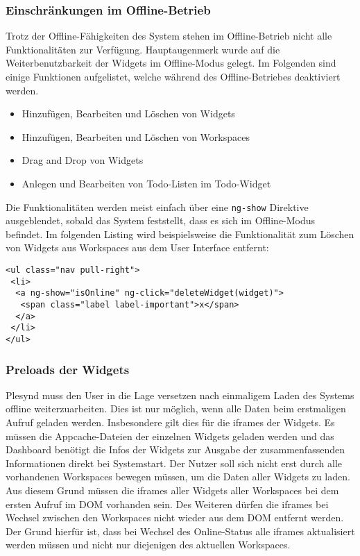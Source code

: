 \subsubsection{Einschränkungen im Offline-Betrieb}\label{section:einschraenkungen_im_offline_betrieb}
Trotz der Offline-Fähigkeiten des System stehen im Offline-Betrieb nicht alle Funktionalitäten zur Verfügung. Hauptaugenmerk wurde auf die Weiterbenutzbarkeit der Widgets im Offline-Modus gelegt. Im Folgenden sind einige Funktionen aufgelistet, welche während des Offline-Betriebes deaktiviert werden.
\begin{itemize}
 \item Hinzufügen, Bearbeiten und Löschen von Widgets
 \item Hinzufügen, Bearbeiten und Löschen von Workspaces
 \item Drag and Drop von Widgets
 \item Anlegen und Bearbeiten von Todo-Listen im Todo-Widget
\end{itemize}
 Die Funktionalitäten werden meist einfach über eine \texttt{ng-show} Direktive ausgeblendet, sobald das System feststellt, dass es sich im Offline-Modus befindet. Im folgenden Listing wird beispielsweise die Funktionalität zum Löschen von Widgets aus Workspaces aus dem User Interface entfernt:
\begin{lstlisting}
<ul class="nav pull-right">
 <li>
  <a ng-show="isOnline" ng-click="deleteWidget(widget)">
   <span class="label label-important">x</span>
  </a>
 </li>
</ul>
\end{lstlisting}

\subsubsection{Preloads der Widgets}
Plesynd muss den User in die Lage versetzen nach einmaligem Laden des Systems offline weiterzuarbeiten. Dies ist nur möglich, wenn alle Daten beim erstmaligen Aufruf geladen werden. Insbesondere gilt dies für die iframes der Widgets. Es müssen die Appcache-Dateien der einzelnen Widgets geladen werden und das Dashboard benötigt die Infos der Widgets zur Ausgabe der zusammenfassenden Informationen direkt bei Systemstart. Der Nutzer soll sich nicht erst durch alle vorhandenen Workspaces bewegen müssen, um die Daten aller Widgets zu laden. Aus diesem Grund müssen die iframes aller Widgets aller Workspaces bei dem ersten Aufruf im DOM vorhanden sein. Des Weiteren dürfen die iframes bei Wechsel zwischen den Workspaces nicht wieder aus dem DOM entfernt werden. Der Grund hierfür ist, dass bei Wechsel des Online-Status alle iframes aktualisiert werden müssen und nicht nur diejenigen des aktuellen Workspaces.

